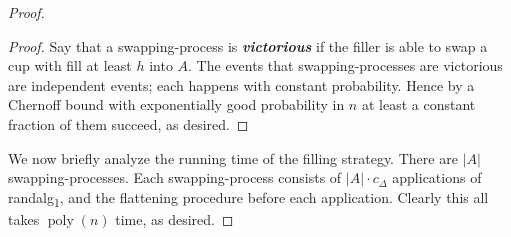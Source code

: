 \documentclass[twocolumn]{article}[10pt]
\newcommand{\defn}[1]{{\textit{\textbf{\boldmath #1}}}\xspace}
\DeclareMathOperator{\poly}{\text{poly}}
\newcommand{\randalg}{randalg\textsubscript{1}\xspace}
\begin{document}
\begin{proof}
\begin{proof}
  Say that a swapping-process is \defn{victorious} if the filler
  is able to swap a cup with fill at least $h$ into $A$. The
  events that swapping-processes are victorious are independent
  events; each happens with constant probability. Hence by a
  Chernoff bound with exponentially good probability in $n$ at
  least a constant fraction of them succeed, as desired.

\end{proof}

We now briefly analyze the running time of the filling strategy.
There are $|A|$ swapping-processes. Each swapping-process
consists of $|A|\cdot c_\Delta$ applications of \randalg, and
the flattening procedure before each application. 
Clearly this all takes $\poly(n)$ time, as desired.
  
\end{proof}
\end{document}
